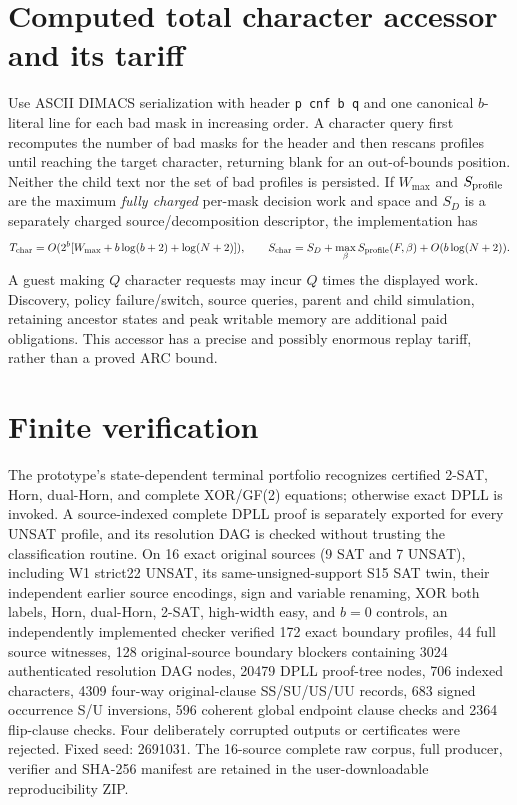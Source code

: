 \documentclass[11pt]{article}
\begin{document}
\section{Computed total character accessor and its tariff}
Use ASCII DIMACS serialization with header \texttt{p cnf b q} and one canonical $b$-literal line for each bad mask in increasing order. A character query first recomputes the number of bad masks for the header and then rescans profiles until reaching the target character, returning blank for an out-of-bounds position. Neither the child text nor the set of bad profiles is persisted. If $W_{\max}$ and $S_{\rm profile}$ are the maximum \emph{fully charged} per-mask decision work and space and $S_D$ is a separately charged source/decomposition descriptor, the implementation has
\[
T_{\rm char}=O(2^b[W_{\max}+b\log(b+2)+\log(N+2)]),\qquad
S_{\rm char}=S_D+\max_{\beta}S_{\rm profile}(F,\beta)+O(b\log(N+2)).
\]
A guest making $Q$ character requests may incur $Q$ times the displayed work. Discovery, policy failure/switch, source queries, parent and child simulation, retaining ancestor states and peak writable memory are additional paid obligations. This accessor has a precise and possibly enormous replay tariff, rather than a proved ARC bound.

\section{Finite verification}
The prototype's state-dependent terminal portfolio recognizes certified 2-SAT, Horn, dual-Horn, and complete XOR/GF(2) equations; otherwise exact DPLL is invoked. A source-indexed complete DPLL proof is separately exported for every UNSAT profile, and its resolution DAG is checked without trusting the classification routine. On 16 exact original sources (9 SAT and 7 UNSAT), including W1 strict22 UNSAT, its same-unsigned-support S15 SAT twin, their independent earlier source encodings, sign and variable renaming, XOR both labels, Horn, dual-Horn, 2-SAT, high-width easy, and $b=0$ controls, an independently implemented checker verified 172 exact boundary profiles, 44 full source witnesses, 128 original-source boundary blockers containing 3024 authenticated resolution DAG nodes, 20479 DPLL proof-tree nodes, 706 indexed characters, 4309 four-way original-clause SS/SU/US/UU records, 683 signed occurrence S/U inversions, 596 coherent global endpoint clause checks and 2364 flip-clause checks. Four deliberately corrupted outputs or certificates were rejected. Fixed seed: 2691031. The 16-source complete raw corpus, full producer, verifier and SHA-256 manifest are retained in the user-downloadable reproducibility ZIP.
\end{document}
